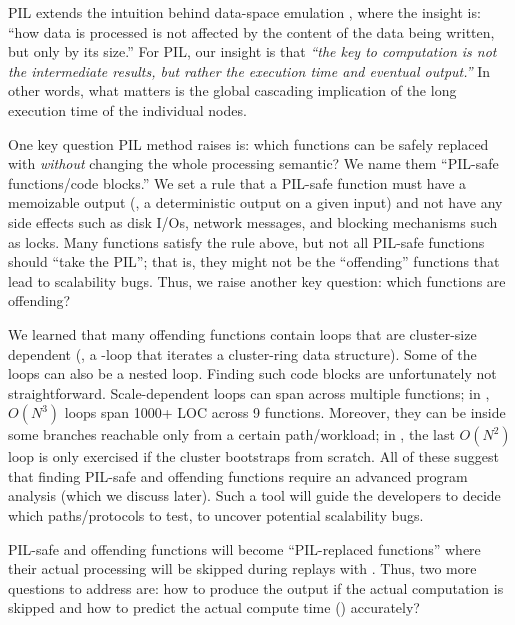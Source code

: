 PIL extends the intuition behind data-space emulation
\cite{Wang+14-Exalt}, where the insight is: ``how data is processed is not
affected by the content of the data being written, but only by its size.''
%
For PIL, our insight is that {\em ``the key to computation is not the
  intermediate results, but rather the execution time and eventual
  output.''}
%
In other words, what matters is the global cascading implication of the
long execution time of the individual nodes.


 One key question PIL
method raises is: which functions can be safely replaced with \sleep
\textit{without} changing the whole processing semantic?  We name them
``PIL-safe functions/code blocks.''
%
We set a rule that a PIL-safe function must have a memoizable output (\ie,
a deterministic output on a given input) and not have any side effects
such as disk I/Os, network messages, and blocking mechanisms such as
locks.  
%
Many functions satisfy the rule above, but not all PIL-safe functions
should ``take the PIL''; that is, they might not be the ``offending''
functions that lead to scalability bugs.  Thus, we raise another key
question: which functions are offending?


We learned that many offending functions contain loops that are
cluster-size dependent (\eg, a -loop that iterates a cluster-ring
data structure).  Some of the loops can also be a nested loop.
%
Finding such code blocks are unfortunately not straightforward.
Scale-dependent loops can span across multiple functions; in \caone,
$O(N^3)$ loops span 1000+ LOC across 9 functions.  Moreover, they can be
inside some  branches reachable only from a certain
path/workload; in \caone, the last $O(N^2)$ loop is only exercised
if the cluster bootstraps from scratch.
%
All of these suggest that finding PIL-safe and offending functions require
an advanced program analysis (which we discuss later).  Such a tool will
guide the developers to decide which paths/protocols to test, to uncover
potential scalability bugs.




 PIL-safe and offending
functions will become ``PIL-replaced functions'' where their actual
processing will be skipped during replays with .
%
Thus, two more questions to address are: how to produce the output if the
actual computation is skipped and how to predict the actual compute time
() accurately?


